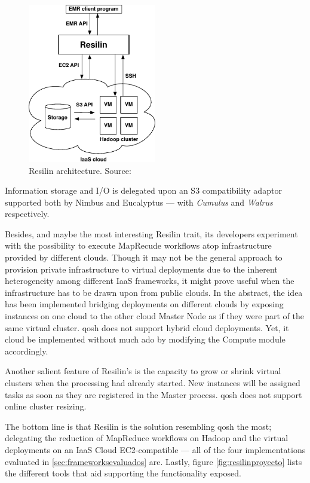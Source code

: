 \begin{figure}[tbp]
\begin{center}
\includegraphics[width=0.5\textwidth]{imagenes/035.pdf}
 \caption{Resilin architecture. Source: \cite{resilin}}
\label{fig:arquitecturaresilin}
\end{center}
\end{figure}

Information storage and I/O is delegated upon an S3 compatibility adaptor supported both by Nimbus and Eucalyptus --- with \emph{Cumulus} and \emph{Walrus} respectively.

Besides, and maybe the most interesting Resilin trait, its developers experiment with the possibility to execute MapRecude workflows atop infrastructure provided by different clouds. Though it may not be the general approach to provision private infrastructure to virtual deployments due to the inherent heterogeneity among different IaaS frameworks, it might prove useful when the infrastructure has to be drawn upon from public clouds. In the abstract, the idea has been implemented bridging deployments on different clouds by exposing instances on one cloud to the other cloud Master Node as if they were part of the same virtual cluster. qosh does not support hybrid cloud deployments. Yet, it cloud be implemented without much ado by modifying the Compute module accordingly.

Another salient feature of Resilin's is the capacity to grow or shrink virtual clusters when the processing had already started. New instances will be assigned tasks as soon as they are registered in the Master process. qosh does not support online cluster resizing.

The bottom line is that Resilin is the solution resembling qosh the most; delegating the reduction of MapReduce workflows on Hadoop and the virtual deployments on an IaaS Cloud EC2-compatible --- all of the four implementations evaluated in \ref{sec:frameworksevaluados} are. Lastly, figure \ref{fig:resilinproyecto} lists the different tools that aid supporting the functionality exposed.

